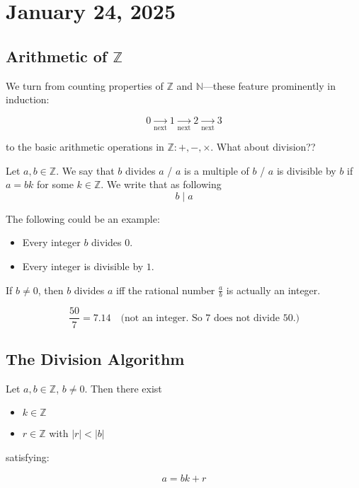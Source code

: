 \documentclass[11pt]{article}
\begin{document}
\section{January 24, 2025}

\subsection{Arithmetic of \(\mathbb{Z}\)}

We turn from counting properties of \(\mathbb{Z}\) and \(\mathbb{N}\)—these
feature prominently in induction:

\[
    0 \underset{\text{next}}{\rightarrow} 1 \underset{\text{next}}{\rightarrow} 2 \underset{\text{next}}{\rightarrow} 3
\]

to the basic arithmetic operations in \(\mathbb{Z}: +, -, \times\). What about
division??

\begin{definition}
    Let \(a, b \in \mathbb{Z}\). We say that \(b\) divides \(a\) / \(a\) is a multiple of \(b\) / \(a\) is divisible by \(b\) if \(a = bk\) for some \(k \in \mathbb{Z}\). We
    write that as following
    \[ b \mid a\]
\end{definition}

\begin{example}
    The following could be an example:
    \begin{itemize}
        \item Every integer \(b\) divides \(0\).
        \item Every integer is divisible by \(1\).
    \end{itemize}
\end{example}

\begin{fact}
    If \(b \neq 0\), then \(b\) divides \(a\) iff the rational number \(\frac{a}{b}\) is actually an integer.
\end{fact}
\begin{example}
    \[
        \frac{50}{7} = 7.14 \quad \text{(not an integer. So 7 does not divide 50.)}
    \]

\end{example}

\subsection{The Division Algorithm}
\begin{theorem}

    Let \(a, b \in \mathbb{Z}\), \(b \neq 0\). Then there exist
    \begin{itemize}
        \item \(k \in \mathbb{Z}\)
        \item \(r \in \mathbb{Z}\) with \(|r| < |b|\)
    \end{itemize}
    satisfying:

    \[ a = bk + r \]

\end{theorem}
\end{document}
